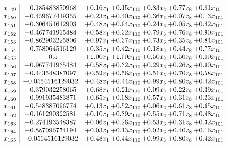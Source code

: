 \documentclass[8pt]{article}
\begin{document}
\[\begin{array}{c| c c@{\hskip 2pt} c@{\hskip 2pt} c@{\hskip 2pt} c@{\hskip 2pt} c@{\hskip 2pt} }
 x_{149}   &  -0.185483870968 & +  0.16 x_{1} & +  0.15 x_{110} & +  0.83 x_{3} & +  0.77 x_{8} & +  0.81 x_{101}\\
 x_{150}   &  -0.459677419355 & +  0.23 x_{1} & +  0.40 x_{110} & +  0.36 x_{3} & +  0.07 x_{8} & +  0.13 x_{101}\\
 x_{151}   &  -0.306451612903 & +  0.48 x_{1} & +  0.94 x_{110} & +  0.24 x_{3} & +  0.05 x_{8} & +  0.42 x_{101}\\
 x_{152}   &  -0.467741935484 & +  0.58 x_{1} & +  0.32 x_{110} & +  0.79 x_{3} & +  0.76 x_{8} & +  0.90 x_{101}\\
 x_{153}   &  -0.862903225806 & +  0.97 x_{1} & +  0.37 x_{110} & +  0.73 x_{3} & +  0.35 x_{8} & +  0.84 x_{101}\\
 x_{154}   &  -0.758064516129 & +  0.35 x_{1} & +  0.42 x_{110} & +  0.18 x_{3} & +  0.44 x_{8} & +  0.77 x_{101}\\
 x_{155}   &  -0.5 & +  1.00 x_{1} & +  1.00 x_{110} & +  0.50 x_{3} & +  0.50 x_{8} & +  0.00 x_{101}\\
 x_{156}   &  -0.967741935484 & +  0.58 x_{1} & +  0.32 x_{110} & +  0.29 x_{3} & +  0.26 x_{8} & +  0.90 x_{101}\\
 x_{157}   &  -0.443548387097 & +  0.52 x_{1} & +  0.56 x_{110} & +  0.51 x_{3} & +  0.70 x_{8} & +  0.58 x_{101}\\
 x_{158}   &  -0.0564516129032 & +  0.48 x_{1} & +  0.44 x_{110} & +  0.99 x_{3} & +  0.80 x_{8} & +  0.42 x_{101}\\
 x_{159}   &  -0.379032258065 & +  0.68 x_{1} & +  0.21 x_{110} & +  0.09 x_{3} & +  0.22 x_{8} & +  0.39 x_{101}\\
 x_{160}   &  -0.991935483871 & +  0.65 x_{1} & +  0.08 x_{110} & +  0.57 x_{3} & +  0.31 x_{8} & +  0.23 x_{101}\\
 x_{161}   &  -0.548387096774 & +  0.13 x_{1} & +  0.52 x_{110} & +  0.06 x_{3} & +  0.61 x_{8} & +  0.65 x_{101}\\
 x_{162}   &  -0.161290322581 & +  0.10 x_{1} & +  0.39 x_{110} & +  0.55 x_{3} & +  0.71 x_{8} & +  0.48 x_{101}\\
 x_{163}   &  -0.274193548387 & +  0.06 x_{1} & +  0.26 x_{110} & +  0.53 x_{3} & +  0.31 x_{8} & +  0.32 x_{101}\\
 x_{164}   &  -0.887096774194 & +  0.03 x_{1} & +  0.13 x_{110} & +  0.02 x_{3} & +  0.40 x_{8} & +  0.16 x_{101}\\
 x_{165}   &  -0.0564516129032 & +  0.48 x_{1} & +  0.44 x_{110} & +  0.99 x_{3} & +  0.80 x_{8} & +  0.42 x_{101}\\

\end{array}\]
\end{document}
